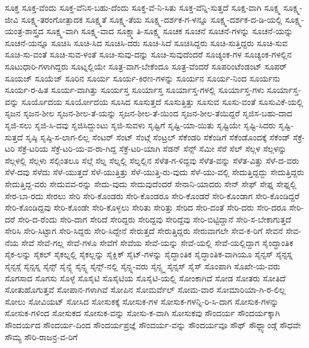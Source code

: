 {ಸೂಕ್ತ
ಸೂಕ್ತ-ವೆಂದು
ಸೂಕ್ತ-ವೆನಿಸ-ಬಹು-ದೆಂದು
ಸೂಕ್ತ-ವೆ-ನಿ-ಸಿತು
ಸೂಕ್ತ-ವೆನ್ನಿ-ಸುತ್ತದೆ
ಸೂಕ್ಷ-ವಾಗಿ
ಸೂಕ್ಷ್ಮ
ಸೂಕ್ಷ್ಮ-ಜೀವಿ
ಸೂಕ್ಷ್ಮ-ತರಂಗೋತ್ಪಾದಕ
ಸೂಕ್ಷ್ಮತೆ
ಸೂಕ್ಷ್ಮ-ತೆಯ
ಸೂಕ್ಷ್ಮ-ದರ್ಶಕ-ಗ-ಳನ್ನೂ
ಸೂಕ್ಷ್ಮ-ದರ್ಶಕ-ದ-ಡಿ-ಯಲ್ಲಿ
ಸೂಕ್ಷ್ಮ-ಯಂತ್ರ-ಶಾಸ್ತ್ರದ
ಸೂಕ್ಷ್ಮ-ವಾಗಿ
ಸೂಕ್ಷ್ಮ-ವಾದ
ಸೂಕ್ಷ್ಮಾತಿ-ಸೂಕ್ಷ್ಮ
ಸೂಚಕ
ಸೂಚನೆ
ಸೂಚನೆ-ಗಳನ್ನು
ಸೂಚನೆ-ಯನ್ನು
ಸೂಚನೆ-ಯನ್ನೂ
ಸೂಚಿಸಿ
ಸೂಚಿ-ಸಿದ
ಸೂಚಿಸಿ-ದರು
ಸೂಚಿ-ಸಿದೆ
ಸೂಚಿಸಿದ್ದರು
ಸೂಚಿ-ಸುತ್ತಿದ್ದರು
ಸೂಚಿ-ಸುವ
ಸೂಚಿ-ಸು-ವಂತೆ
ಸೂಚಿ-ಸುವ-ಳಂತೆ
ಸೂಚಿ-ಸುವು-ದನ್ನು
ಸೂಚಿ-ಸುವುದೆಂದರೆ
ಸೂಚ್ಯಂಕ-ಗಳ
ಸೂಚ್ಯಂಕ-ಗಳಲ್ಲಿನ
ಸೂಟುಧಾರಿ-ಗಳಾಗಿದ್ದರು
ಸೂಟ್ನಲ್ಲಿಯೇ
ಸೂತ್ರ-ವಾಗ-ಬೇಕೆಂದೂ
ಸೂತ್ರ-ವೆಂದರೆ
ಸೂಪರಿಂಟೆಂಡಂಟ್
ಸೂಪರ್
ಸೂಯಜ್
ಸೂಯೆಜ್
ಸೂರಿನ
ಸೂರ್ಯ
ಸೂರ್ಯ-ಕಿರಣ-ಗಳನ್ನು
ಸೂರ್ಯನ
ಸೂರ್ಯ-ನಿಂದ
ಸೂರ್ಯನು
ಸೂರ್ಯ-ರ-ಹಿತ
ಸೂರ್ಯ-ವಾಗಿತ್ತು
ಸೂರ್ಯಸ್ತ
ಸೂರ್ಯಾಸ್ತ
ಸೂರ್ಯಾಸ್ತ-ಗಳಲ್ಲಿ
ಸೂರ್ಯಾಸ್ತ-ಗಳು
ಸೂರ್ಯಾಸ್ತ-ವನ್ನು
ಸೂರ್ಯೊದಯ
ಸೂರ್ಯೋದಯ
ಸೂಸಿದ
ಸೂಸುತ್ತದೆ
ಸೂಸುತ್ತಿತ್ತು
ಸೂಸುವ
ಸೂಸು-ವಂತೆ
ಸೂಸುವಿಕೆ-ಯಲ್ಲಿ
ಸೃಜನ
ಸೃಜನ-ಶೀಲ
ಸೃಜನ-ಶೀಲ-ತೆ-ಯನ್ನು
ಸೃಜನ-ಶೀಲ-ತೆ-ಯಿಂದ
ಸೃಜನ-ಶೀಲ-ತೆಯಿದ್ದರೆ
ಸೃಜಿಸ-ಬಹು-ದಾದ
ಸೃಜಿ-ಸಲು
ಸೃಜಿ-ಸಿ-ದವು
ಸೃಜಿಸಿದ್ದುಂಟು
ಸೃಜಿ-ಸುವಳು
ಸೃಷ್ಟಿಗೆ
ಸೃಷ್ಟಿ-ಯಾ-ಯಿತು
ಸೃಷ್ಟಿಯೇ
ಸೃಷ್ಟಿ-ಸಿದರು
ಸೃಷ್ಟಿ-ಸುತ್ತದೆ
ಸೃಷ್ಠಿ
ಸೃಷ್ಠಿ-ಸ-ಲಾಗ-ಲಿಲ್ಲ
ಸೆಂಟರ್
ಸೆಂಟ್
ಸೆಂಟ್ಗೆ
ಸೆಂಟ್ರಲ್
ಸೆಕೆಂಡರಿ
ಸೆಕೆಂಡಿಗೆ
ಸೆಕೆಂಡೊಂದಕ್ಕೆ
ಸೆಕೆಂಡ್
ಸೆಕ್ರೆ-ಟರಿ
ಸೆಕ್ರೆ-ಟರಿಯ
ಸೆಕ್ರೆ-ಟರಿ-ಯ-ವ-ರಾ-ಗಿದ್ದ
ಸೆಕ್ರೆ-ಟರಿ-ಯಾಗಿ
ಸೆಡನ್
ಸೆನ್ಸ್
ಸೆಮೀ
ಸೆರೆ
ಸೆಲ್
ಸೆಲ್ಗಳ
ಸೆಲ್ಗಳನ್ನು
ಸೆಲ್ಗಳಲ್ಲಿ
ಸೆಲ್ಗಳು
ಸೆಲ್ಗಿಂತಲೂ
ಸೆಲ್ಗೆ
ಸೆಲ್ನ
ಸೆಲ್ನಲ್ಲಿ
ಸೆಲ್ನಲ್ಲಿನ
ಸೆಳೆತ-ಗ-ಳಿದ್ದವು
ಸೆಳೆತ-ವನ್ನು
ಸೆಳೆತ-ವಿತ್ತು
ಸೆಳೆ-ದ-ವರು
ಸೆಳೆ-ದವು
ಸೆಳೆದು
ಸೆಳೆ-ಯುತ್ತದೆ
ಸೆಳೆ-ಯುತ್ತಿತ್ತು
ಸೆಳೆ-ಯುತ್ತಿ-ರು-ವುದು
ಸೆಳೆ-ಯು-ವಲ್ಲಿ
ಸೇದುತ್ತಿದ್ದದ್ದು
ಸೇದುತ್ತಿದ್ದರು
ಸೇದುತ್ತಿದ್ದ-ವರು
ಸೇದುವವ-ರನ್ನು
ಸೇದು-ವುದು
ಸೇದುವುದೆಂದರೆ
ಸೇನಾನಿ-ಯಾದರು
ಸೇನ್
ಸೇಫ್
ಸೇಫ್ನ
ಸೇಫ್ನಲ್ಲಿ
ಸೇರ-ಬಾ-ರದು
ಸೇರಲು
ಸೇರಿ
ಸೇರಿ-ಕೊಂಡರು
ಸೇರಿ-ಕೊಂಡರೂ
ಸೇರಿ-ಕೊಂಡರೆ
ಸೇರಿ-ಕೊಂಡಾಗ
ಸೇರಿ-ಕೊಂಡಿದ್ದರೆ
ಸೇರಿ-ಕೊಂಡಿದ್ದವು
ಸೇರಿ-ಕೊಂಡೇ
ಸೇರಿ-ಕೊಳ್ಳಲು
ಸೇರಿತು
ಸೇರಿತ್ತು
ಸೇರಿದ
ಸೇರಿ-ದಂತೆ
ಸೇರಿ-ದರು
ಸೇರಿ-ದರೂ
ಸೇರಿ-ದರೆ
ಸೇರಿ-ದ-ರೆಂದು
ಸೇರಿ-ದಾಗ
ಸೇರಿದೆ
ಸೇರಿದ್ದರು
ಸೇರಿದ್ದವು
ಸೇರಿದ್ದೆವು
ಸೇರಿ-ಬಿಟ್ಟಿದ್ದಾನೆ
ಸೇರಿ-ಸ-ಬೇಕಾಗುತ್ತದೆ
ಸೇರಿಸಿ
ಸೇರಿ-ಸಿಟ್ಟಾಗ
ಸೇರಿ-ಸಿದ್ದರು
ಸೇರಿ-ಸಿದ್ದೇನೆ
ಸೇರುತ್ತದೆ
ಸೇರುತ್ತಿದ್ದರು
ಸೇರುವಾಗಲೇ
ಸೇವ-ಕ-ರಿಗೆ
ಸೇವನೆ
ಸೇವ-ನೆಯ
ಸೇವೆ
ಸೇವೆ-ಗಲ್ಲ
ಸೇವೆ-ಗಳೂ
ಸೇವೆಗೆ
ಸೇವೆಯ
ಸೇವೆ-ಯನ್ನು
ಸೇವೆ-ಯಲ್ಲಿ
ಸೇವೆ-ಯಲ್ಲಿದ್ದಾಗ
ಸೈಂದ್ಧಾಂತಿಕ
ಸೈಕ-ಲನ್ನು
ಸೈಕಲ್
ಸೈಕಲ್ನಲ್ಲಿ
ಸೈಕಲ್ಲನ್ನು
ಸೈಕ್ಲಿಕ್
ಸೈಟ್-ಗಳನ್ನು
ಸೈದ್ಧಾಂತಿಕ
ಸೈದ್ಧಾಂತಿಕ-ವಾಗಿಯೂ
ಸೈನ್ಸಸ್
ಸೈನ್ಸಸ್ನ
ಸೈನ್ಸಸ್ಗೆ
ಸೈನ್ಸಸ್ನ
ಸೈನ್ಸ್
ಸೈನ್ಸ್ಗೆ
ಸೈನ್ಸ್ನ
ಸೈನ್ಸ್-ನಲ್ಲಿ
ಸೈನ್ಸ್ನ-ವರು
ಸೈನ್ಸ್ಸ್ನ
ಸೈನ್ಸಸ್
ಸೈಸ್
ಸೊಂಪಾಗಿ
ಸೊಖೇ-ಯ-ವರು
ಸೊಗಸಾದ
ಸೊಗಸು
ಸೊಳ್ಳೆ
ಸೊಸೈಟಿ
ಸೊಸೈಟಿಯ
ಸೊಸೈಟಿ-ಯಲ್ಲಿ
ಸೋಂಕಾಗಿದೆ
ಸೋಡ
ಸೋತರು
ಸೋತಿದೆ
ಸೋತುಹೊಗುತ್ತವೆ
ಸೋಪಾನ-ಗಳಾಗಿವೆ
ಸೋಪಿನ
ಸೋಮರ್ವೆಲ್
ಸೋಮ-ವಾರ
ಸೋಮಾರಿಯಾ-ಗಿ-ರ-ಲಿಲ್ಲ
ಸೋಲು
ಸೋವಿಯಟ್
ಸೋಸಿದ
ಸೋಸುಕಕ್ಕೆ
ಸೋಸುಕ-ಗಳ
ಸೋಸುಕ-ಗಳನ್ನಿ-ರಿ-ಸಿ-ದಾಗ
ಸೋಸುಕ-ಗಳನ್ನು
ಸೋಸುಕ-ಗಳಿಂದ
ಸೋಸುಕದ
ಸೋಸುಕ-ವನ್ನು
ಸೋಸು-ಕ-ವಾಗಿ
ಸೋಸುಕವು
ಸೌಂದರ್ಯ
ಸೌಂದರ್ಯಕ್ಕಾಗಿ
ಸೌಂದರ್ಯದ
ಸೌಂದರ್ಯ-ದಿಂದ
ಸೌಂದರ್ಯಪ್ರಜ್ಞೆ
ಸೌಂದರ್ಯ-ವನ್ನು
ಸೌಂದರ್ಯವೂ
ಸೌಥ್
ಸೌಥ್ಲ್ಯಾಂಡ್ಗೆ
ಸೌಧವೇ
ಸೌಮ್ಯ
ಸೌರಿ-ರಾಜನ್ರ-ವ-ರಿಗೆ
}
